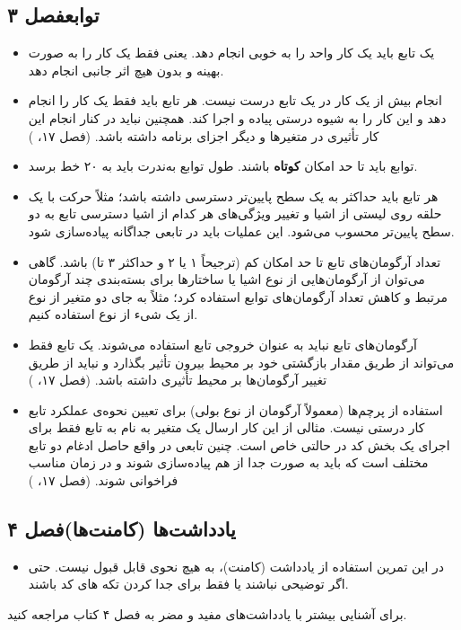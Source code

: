 \documentclass{utap}
\newcommand{\chap}[1]{\hfill\normalfont\normalsize فصل #1}
\begin{document}
\subsection[توابع]{توابع\chap{۳}}
  \begin{itemize}
	\item
یک تابع باید یک کار واحد را به خوبی انجام دهد. یعنی فقط یک کار را به صورت بهینه و بدون هیچ اثر جانبی انجام دهد.
    \item
انجام بیش از یک کار در یک تابع درست نیست. هر تابع باید فقط یک کار را انجام دهد و این کار را به شیوه درستی پیاده و اجرا کند. همچنین نباید در کنار انجام این کار تأثیری در متغیرها و دیگر اجزای برنامه داشته باشد. (فصل ۱۷، )
    \item
توابع باید تا حد امکان \textbf{کوتاه} باشند.
طول توابع به‌ندرت باید به ۲۰ خط برسد.
	\item
هر تابع باید حداکثر به یک سطح پایین‌تر دسترسی داشته باشد؛ مثلاً حرکت با یک حلقه روی لیستی از اشیا و تغییر ویژگی‌های هر کدام از اشیا دسترسی تابع به دو سطح پایین‌تر محسوب می‌شود. این عملیات باید در تابعی جداگانه پیاده‌سازی شود.
	\item
تعداد آرگومان‌های تابع تا حد امکان کم (ترجیحاً ۱ یا ۲ و حداکثر ۳ تا) باشد.
گاهی می‌توان از آرگومان‌هایی از نوع اشیا یا ساختارها برای بسته‌بندی چند آرگومان مرتبط و کاهش تعداد آرگومان‌های توابع استفاده کرد؛ مثلاً به جای دو متغیر از نوع  از یک شیء از نوع  استفاده کنیم.
    \item
آرگومان‌های تابع نباید به عنوان خروجی تابع استفاده می‌شوند.
یک تابع فقط می‌تواند از طریق مقدار بازگشتی خود بر محیط بیرون تأثیر بگذارد و نباید از طریق تغییر آرگومان‌ها بر محیط تأثیری داشته باشد. (فصل ۱۷، )
    \item
استفاده از پرچم‌ها (معمولاً آرگومان از نوع بولی) برای تعیین نحوه‌ی عملکرد تابع کار درستی نیست.
مثالی از این کار ارسال یک متغیر به نام  به تابع فقط برای اجرای یک بخش کد در حالتی خاص است. چنین تابعی در واقع حاصل ادغام دو تابع مختلف است که باید به صورت جدا از هم پیاده‌سازی شوند و در زمان مناسب فراخوانی شوند. (فصل ۱۷، )
    \end{itemize}

\subsection[یادداشت‌ها]{یادداشت‌ها (کامنت‌ها)\chap{۴}}
	  \begin{itemize}
	        \item
در این تمرین استفاده از یادداشت (کامنت)، به هیچ نحوی قابل قبول نیست. حتی اگر توضیحی نباشند یا فقط برای جدا کردن تکه های کد باشند.
	    \end{itemize}
برای آشنایی بیشتر با یادداشت‌های مفید و مضر به فصل ۴ کتاب مراجعه کنید.
\end{document}
